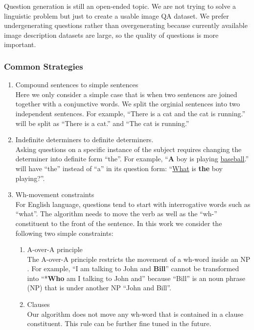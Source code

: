 \documentclass{article}
\renewcommand{\#}[1]{\textbf{#1}}
\begin{document}
Question generation is still an open-ended topic. We are not trying to solve a linguistic problem but just to create a usable image QA dataset. We prefer undergenerating questions rather than overgenerating because currently available image description datasets are large, so the quality of questions is more important.

\subsubsection{Common Strategies}
\begin{enumerate}
\item Compound sentences to simple sentences \\
Here we only consider a simple case that is when two sentences are joined together with a conjunctive words. We split the orginial sentences into two independent sentences. For example, ``There is a cat and the cat is running.'' will be split as ``There is a cat.'' and ``The cat is running.''

\item Indefinite determiners to definite determiners.\\
Asking questions on a specific instance of the subject requires changing the determiner into definite form ``the''. For example, ``\textbf{A} boy is playing \underline{baseball}.'' will have ``the'' instead of ``a'' in its question form: ``\underline{What} is \textbf{the} boy playing?''.

\item Wh-movement constraints \\
For English language, questions tend to start with interrogative words such as ``what''. The algorithm needs to move the verb as well as the ``wh-'' constituent to the front of the sentence. In this work we consider the following two simple constraints:
\begin{enumerate}
\item A-over-A principle\\
The A-over-A principle restricts the movement of a wh-word inside an NP \cite{chomsky73}. For example, ``I am talking to John and \textbf{Bill}'' cannot be transformed into ``*\textbf{Who} am I talking to John and'' because ``Bill'' is an noun phrase (NP) that is under another NP ``John and Bill''.
\item Clauses\\
Our algorithm does not move any wh-word that is contained in a clause constituent. This rule can be further fine tuned in the future.
\end{enumerate}
\end{enumerate}
\end{document}
